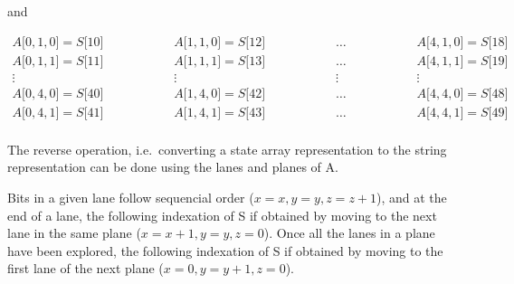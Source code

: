 and

\begin{equation}
\begin{aligned}
A \lbrack 0,1,0\rbrack = S\lbrack 10 \rbrack & \hspace{2cm} A \lbrack 1,1,0\rbrack = S\lbrack 12 \rbrack & \hspace{2cm} \ldots & \hspace{2cm} A \lbrack 4,1,0\rbrack = S\lbrack 18 \rbrack\\
A \lbrack 0,1,1\rbrack = S\lbrack 11 \rbrack & \hspace{2cm} A \lbrack 1,1,1\rbrack = S\lbrack 13 \rbrack & \hspace{2cm} \ldots & \hspace{2cm} A \lbrack 4,1,1\rbrack = S\lbrack 19 \rbrack\\
\vdots                                       & \hspace{2cm} \vdots                                       & \hspace{2cm} \vdots & \hspace{2cm} \vdots                                    \\
A \lbrack 0,4,0\rbrack = S\lbrack 40 \rbrack & \hspace{2cm} A \lbrack 1,4,0\rbrack = S\lbrack 42 \rbrack & \hspace{2cm} \ldots & \hspace{2cm} A \lbrack 4,4,0\rbrack = S\lbrack 48 \rbrack\\
A \lbrack 0,4,1\rbrack = S\lbrack 41 \rbrack & \hspace{2cm} A \lbrack 1,4,1\rbrack = S\lbrack 43 \rbrack & \hspace{2cm} \ldots & \hspace{2cm} A \lbrack 4,4,1\rbrack = S\lbrack 49 \rbrack\\
\end{aligned}
\end{equation}


The reverse operation, i.e.\ converting a state array representation to the string representation can be done using the lanes and planes of A.

Bits in a given lane follow sequencial order ($x=x, y=y, z=z+1$), and at the end of a lane, the following indexation of S if obtained by moving to the next lane in the same plane ($x=x+1, y=y, z=0$).
Once all the lanes in a plane have been explored, the following indexation of S if obtained by moving to the first lane of the next plane ($x=0, y=y+1, z=0$).

